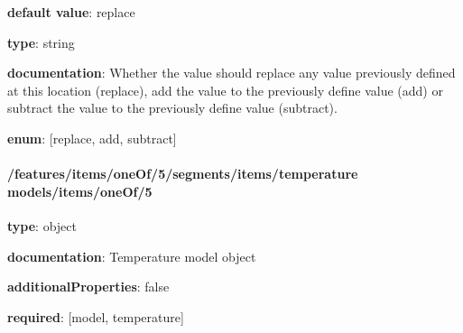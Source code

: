 \begin{itemized}
\item {\bf default value}: replace
\item {\bf type}: string
\item {\bf documentation}: Whether the value should replace any value previously defined at this location (replace), add the value to the previously define value (add) or subtract the value to the previously define value (subtract).
\item {\bf enum}: [replace, add, subtract]\end{itemized}\paragraph{/features/items/oneOf/5/segments/items/temperature models/items/oneOf/5} \begin{itemized}
\item {\bf type}: object
\item {\bf documentation}: Temperature model object
\item {\bf additionalProperties}: false
\item {\bf required}: [model, temperature]\end{itemized}
